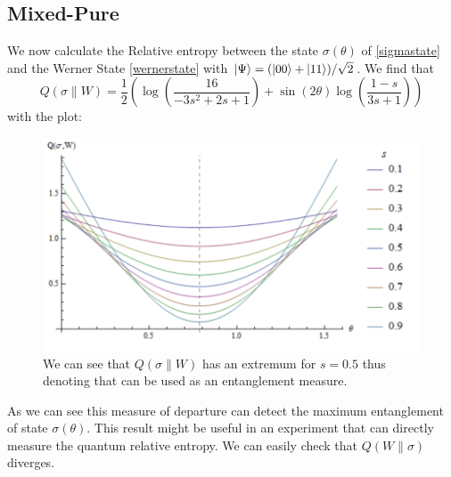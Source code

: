 \subsection{Mixed-Pure}
We now calculate the Relative entropy between the state $\sigma(\theta)$ of \eqref{sigmastate} and the Werner State \eqref{wernerstate} with $\ket{\Psi}=(\ket{00}+\ket{11})/\sqrt{2}$. We find that  
\begin{equation}
Q(\sigma\|W)=\frac{1}{2} \left(\log \left(\frac{16}{-3 s^2+2 s+1}\right)+\sin (2 \theta ) \log \left(\frac{1-s}{3 s+1}\right)\right)
\label{qentropy}
\end{equation}
with the plot:
\begin{figure}[H]
\begin{center}
\includegraphics[scale=0.8]{figures/PureMixedRelativeEntropy.png}\caption{We can see that $Q(\sigma\|W)$ has an extremum for $s=0.5$ thus denoting that can be used as an entanglement measure.}
\label{figr7}
\end{center}
\end{figure}
\noindent
As we can see this measure of departure can detect the maximum entanglement of state $\sigma(\theta)$. This result might be useful in an experiment that can directly measure the quantum relative entropy.  We can easily check that $Q(W\|\sigma)$ diverges.
